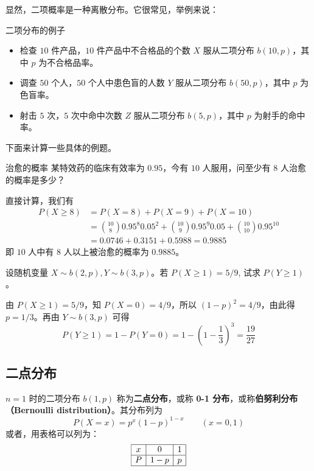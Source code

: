 显然，二项概率是一种离散分布。它很常见，举例来说：
\begin{example}{二项分布的例子}
\begin{itemize}
\item 检查 $10$ 件产品，$ 10 $ 件产品中不合格品的个数 $X $ 服从二项分布 $b(10,p)$，其中 $p$ 为不合格品率。
\item 调查 $50 $ 个人，$ 50 $ 个人中患色盲的人数 $Y $ 服从二项分布 $b(50,p)$，其中 $p$ 为色盲率。
\item 射击 $5 $ 次，$ 5 $ 次中命中次数 $Z $ 服从二项分布 $b(5,p)$，其中 $p $ 为射手的命中率。
\end{itemize}
\end{example}

下面来计算一些具体的例题。
\begin{example}{治愈的概率}
某特效药的临床有效率为 $0. 95$，今有 $10 $ 人服用，问至少有 $8 $ 人治愈的概率是多少？

直接计算，我们有
\begin{equation}
\begin{aligned} P(X \geqslant 8) &=P(X=8)+P(X=9)+P(X=10) \\ &=\binom{10}{8} 0.95^{8} 0.05^{2}+\binom{10}{9} 0.95^{9} 0.05+\binom{10}{10} 0.95^{10} \\ &=0.0746+0.3151+0.5988=0.9885 \end{aligned}
\end{equation}
即 $10 $ 人中有 $8 $ 人以上被治愈的概率为 $0. 988 5$。
\end{example}

\begin{example}{}
设随机变量 $X\sim b(2,p),Y\sim b(3,p)$。若 $P (X\geqslant1) = 5/9$, 试求 $P(Y\geqslant1)$。

由 $P(X\geqslant1)=5/9$，知 $P(X=0)=4/9$，所以 $(1-p)^2=4/9$，由此得 $p=1/3$。再由 $Y\sim b(3,p)$ 可得
\begin{equation}
P(Y \geqslant 1)=1-P(Y=0)=1-\left(1-\frac{1}{3}\right)^{3}=\frac{19}{27}
\end{equation}
\end{example}

\subsection{二点分布}
$n=1$ 时的二项分布 $b (1 ,p)$ 称为\textbf{二点分布}，或称 \textbf{0-1 分布}，或称\textbf{伯努利分布（Bernoulli distribution）}。其分布列为
\begin{equation}
P(X=x)=p^{x}(1-p)^{1-x} \qquad (x=0,1)
\end{equation}
或者，用表格可以列为：
\begin{equation}
\begin{array}{|c|c|c|}\hline x & 0 & 1 \\ \hline P & 1-p & p \\ \hline  \end{array}
\end{equation}

